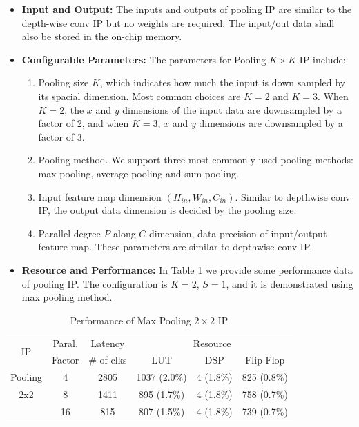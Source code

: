 \documentclass[a4paper, 11pt]{article}
\begin{document}
\begin{itemize}
    \item {
\textbf{Input and Output:} The inputs and outputs of pooling IP are similar to the depth-wise conv IP but no weights are required.
The input/out data shall also be stored in the on-chip memory.
    }
    \item {
\textbf{Configurable Parameters:} 
The parameters for Pooling $K \times K$ IP include:
\begin{enumerate}
    \item {
    Pooling size $K$, which indicates how much the input is down sampled by its spacial dimension. Most common choices are $K=2$ and $K=3$.
    When $K=2$, the $x$ and $y$ dimensions of the input data are downsampled by a factor of 2, and when $K=3$, $x$ and $y$ dimensions are downsampled by a factor of 3.
    }
    \item {
    Pooling method. We support three most commonly used pooling methods: max pooling, average pooling and sum pooling.
    }
    \item {
    Input feature map dimension $(H_{in}, W_{in}, C_{in})$. Similar to depthwise conv IP, the output data dimension is decided by the pooling size.
    }
    \item {
    Parallel degree $P$ along $C$ dimension, data precision of input/output feature map. These parameters are similar to depthwise conv IP.
    }
\end{enumerate}
    }
    
    \item {
    \textbf{Resource and Performance:} In Table \ref{tab:pool} we provide some performance data of pooling IP.
    The configuration is $K=2$, $S=1$, and it is demonstrated using max pooling method.
    }
    
\end{itemize}



\begin{table}[]
\centering
\caption{Performance of Max Pooling $2 \times 2$ IP\vspace{-12pt}} \label{tab:pool}
\renewcommand{\arraystretch}{1.1}
\setlength{\tabcolsep}{4pt}
\begin{tabular}{|c | c | c | c c c| }
\hline 
 \multirow{2}{*}{IP} & Paral. & Latency & \multicolumn{3}{c|}{Resource} \\ \cline{4-6}
 	& Factor  & \# of clks & LUT & DSP & Flip-Flop  \\
 \hline \hline

Pooling & 4 & 2805 &  1037 (2.0\%) & 4 (1.8\%) & 825 (0.8\%)  \\
 2x2    & 8 & 1411 &  895 (1.7\%) & 4 (1.8\%) & 758 (0.7\%)  \\
 	    & 16 & 815 &  807 (1.5\%) & 4 (1.8\%) & 739 (0.7\%)  \\ \hline
 
 \hline
\end{tabular}
\end{table}
\end{document}
